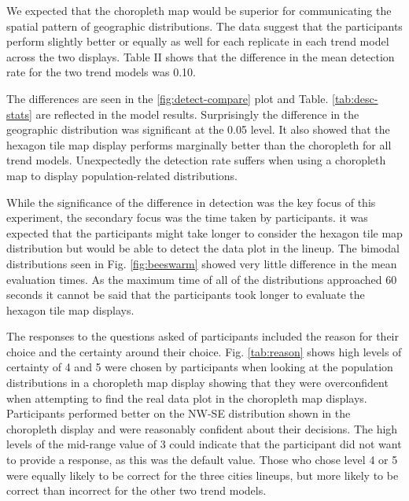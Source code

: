 \documentclass[times, doublespace]{anzsauth}
\begin{document}
We expected that the choropleth map would be superior for communicating
the spatial pattern of geographic distributions. The data suggest that
the participants perform slightly better or equally as well for each
replicate in each trend model across the two displays. Table II shows
that the difference in the mean detection rate for the two trend models
was 0.10.

The differences are seen in the \ref{fig:detect-compare} plot and Table.
\ref{tab:desc-stats} are reflected in the model results. Surprisingly
the difference in the geographic distribution was significant at the
0.05 level. It also showed that the hexagon tile map display performs
marginally better than the choropleth for all trend models. Unexpectedly
the detection rate suffers when using a choropleth map to display
population-related distributions.

While the significance of the difference in detection was the key focus
of this experiment, the secondary focus was the time taken by
participants. it was expected that the participants might take longer to
consider the hexagon tile map distribution but would be able to detect
the data plot in the lineup. The bimodal distributions seen in Fig.
\ref{fig:beeswarm} showed very little difference in the mean evaluation
times. As the maximum time of all of the distributions approached 60
seconds it cannot be said that the participants took longer to evaluate
the hexagon tile map displays.

The responses to the questions asked of participants included the reason
for their choice and the certainty around their choice. Fig.
\ref{tab:reason} shows high levels of certainty of 4 and 5 were chosen
by participants when looking at the population distributions in a
choropleth map display showing that they were overconfident when
attempting to find the real data plot in the choropleth map displays.
Participants performed better on the NW-SE distribution shown in the
choropleth display and were reasonably confident about their decisions.
The high levels of the mid-range value of 3 could indicate that the
participant did not want to provide a response, as this was the default
value. Those who chose level 4 or 5 were equally likely to be correct
for the three cities lineups, but more likely to be correct than
incorrect for the other two trend models.
\end{document}
